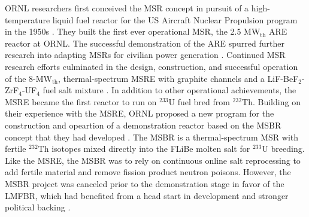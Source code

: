 \gls{ORNL} researchers first conceived the \gls{MSR} concept in pursuit of a high-temperature
liquid fuel reactor for the US Aircraft Nuclear Propulsion program in
the 1950s \cite{rosenthal_molten-salt_1970}. They
built the first ever operational \gls{MSR}, the 2.5 MW$_{\text{th}}$
\gls{ARE} reactor at \gls{ORNL}. The successful demonstration of the \gls{ARE} spurred further
research into adapting \glspl{MSR} for civilian power generation
\cite{rosenthal_molten-salt_1970}. Continued \gls{MSR} research efforts culminated in the design,
construction, and successful operation of the 8-MW$_{\text{th}}$, thermal-spectrum \gls{MSRE} with
graphite channels and a LiF-BeF$_2$-ZrF$_4$-UF$_4$ fuel salt mixture
\cite{haubenreich_experience_1970}. In addition to other operational achievements, the
\gls{MSRE} became the first reactor to run on $^{233}$U fuel bred from $^{232}$Th. Building on
their experience with the \gls{MSRE}, \gls{ORNL} proposed a new program for the construction and
opeartion of a demonstration reactor based on the \gls{MSBR} concept that they had developed
\cite{macpherson_molten_1985}. The \gls{MSBR} is a thermal-spectrum \gls{MSR} with fertile
$^{232}$Th isotopes mixed directly into the \gls{FLiBe} molten salt for $^{233}$U breeding. Like
the \gls{MSRE}, the \gls{MSBR} was to rely on continuous online salt reprocessing to add fertile
material and remove fission product neutron poisons.
However, the \gls{MSBR} project was canceled prior to the demonstration stage in
favor of the \gls{LMFBR}, which had benefited from a head start in development and stronger
political backing \cite{macpherson_molten_1985}.

